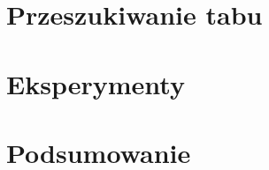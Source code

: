 \documentclass{article}
\begin{document}

\section{Przeszukiwanie tabu}


\section{Eksperymenty}


\clearpage

\section{Podsumowanie}


\clearpage




\end{document}
